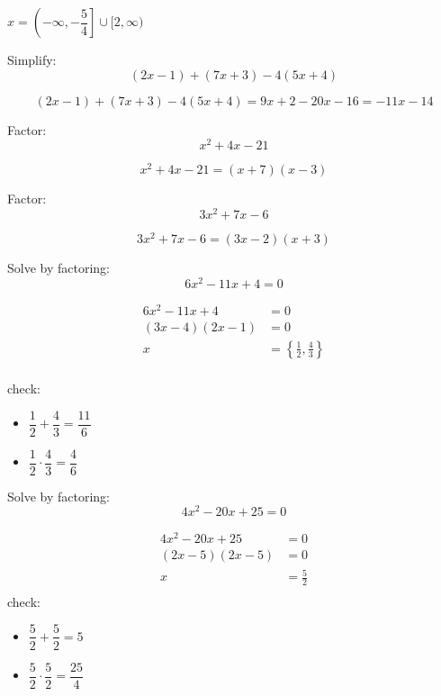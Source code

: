 \documentclass[fleqn,addpoints]{exam}
\begin{document}
\begin{questions}
\begin{solution}
$x = \left( -\infty, -\dfrac{5}{4} \right] \cup [2, \infty)$

\end{solution}


\question
Simplify:
\[ 
  (2x - 1) + (7x + 3) - 4(5x + 4) 
\]

\begin{solution}
\[
  (2x - 1) + (7x + 3) - 4(5x + 4) = 9x+2 -20x-16 = -11x-14
\]
\end{solution}

\question
Factor:
\[
  x^2 + 4x - 21
\]

\begin{solution}
\[
  x^2 + 4x - 21 = (x+7)(x-3)
\]
\end{solution}

\question
Factor:
\[
  3x^2 + 7x - 6
\]

\begin{solution}
\[
  3x^2 + 7x - 6 = (3x - 2)(x + 3)
\]
\end{solution}

\question
Solve by factoring:
\[
  6x^2 - 11x + 4 = 0
\]

\begin{solution}
\begin{align*}
  6x^2 - 11x + 4 &= 0 \\
  (3x-4)(2x-1) &= 0 \\
  x &= \left \{ \frac{1}{2}, \frac{4}{3} \right \} \\
\end{align*}

check:
\begin{itemize}
  \item \( \dfrac{1}{2} + \dfrac{4}{3} = \dfrac{11}{6}  \)
  \item \( \dfrac{1}{2} \cdot \dfrac{4}{3} = \dfrac{4}{6} \)
\end{itemize}

\end{solution}

\question
Solve by factoring:
\[
  4x^2 - 20x + 25 = 0
\]

\begin{solution}
\begin{align*}
  4x^2 - 20x + 25 &= 0 \\
  (2x - 5)(2x-5) &= 0 \\
  x &= \frac{5}{2} \\
\end{align*}
check:
\begin{itemize}
  \item \( \dfrac{5}{2} + \dfrac{5}{2} = 5 \)
  \item \( \dfrac{5}{2} \cdot \dfrac{5}{2} = \dfrac{25}{4} \)
\end{itemize}


\end{solution}
\end{questions}
\end{document}
